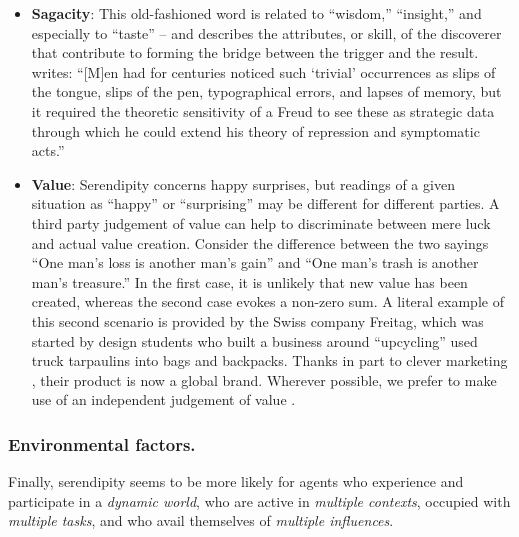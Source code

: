 \begin{itemize}
\item \textbf{Sagacity}: This old-fashioned word is related to
  ``wisdom,'' ``insight,'' and especially to ``taste'' -- and
  describes the attributes, or skill, of the discoverer that
  contribute to forming the bridge between the trigger and the result.
   writes: ``{[}M{]}en had for centuries
  noticed such `trivial' occurrences as slips of the tongue, slips of
  the pen, typographical errors, and lapses of memory, but it required
  the theoretic sensitivity of a Freud to see these as strategic data
  through which he could extend his theory of repression and
  symptomatic acts.''
\end{itemize}


\begin{itemize}
\item \textbf{Value}: Serendipity concerns happy surprises, but
  readings of a given situation as ``happy'' or ``surprising'' may be
  different for different parties.  A third party judgement of value
  can help to discriminate between mere luck and actual value
  creation.  Consider the difference between the two sayings ``One
  man's loss is another man's gain'' and ``One man's trash is another
  man's treasure.''  In the first case, it is unlikely that new value
  has been created, whereas the second case evokes a non-zero sum.
  A literal example of this second scenario is provided by the
  Swiss company Freitag, which was started by design students who
  built a business around ``upcycling'' used truck tarpaulins into
  bags and backpacks.  Thanks in part to clever marketing
  \cite[pp. 54--55, 68--69,]{russo2010companies}, their product is now
  a global brand.  Wherever possible, we prefer to make use of an
  independent judgement of value \cite{jordanous:12}.
\end{itemize}

\subsubsection{Environmental factors.}

Finally, serendipity seems to be more likely for agents who experience and participate in a \emph{dynamic world}, who are active in \emph{multiple contexts}, occupied with \emph{multiple tasks}, and who avail themselves of \emph{multiple influences}.

